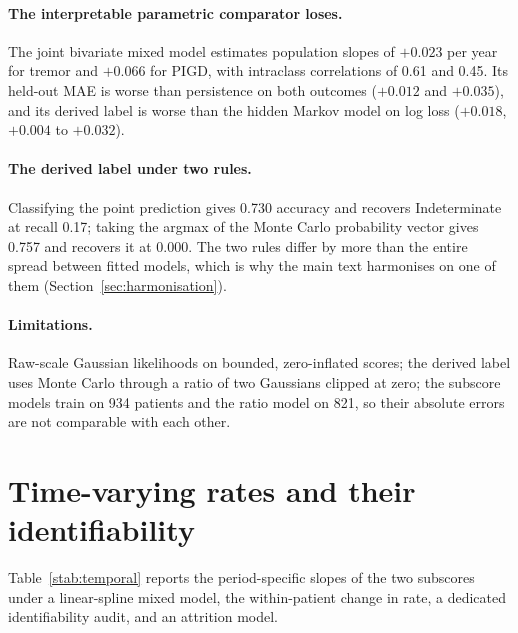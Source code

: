 \paragraph{The interpretable parametric comparator loses.} The joint bivariate
mixed model estimates population slopes of $+0.023$ per year for tremor and
$+0.066$ for PIGD, with intraclass correlations of 0.61 and 0.45. Its held-out
MAE is worse than persistence on both outcomes ($+0.012$ and $+0.035$), and its
derived label is worse than the hidden Markov model on log loss ($+0.018$,
$+0.004$ to $+0.032$).

\paragraph{The derived label under two rules.} Classifying the point prediction
gives 0.730 accuracy and recovers Indeterminate at recall 0.17; taking the argmax
of the Monte Carlo probability vector gives 0.757 and recovers it at 0.000. The
two rules differ by more than the entire spread between fitted models, which is
why the main text harmonises on one of them (Section~\ref{sec:harmonisation}).

\begin{table}[htbp]
\centering
\caption{The full subscore comparison on identical leave-one-patient-out points.}
\label{stab:subscore}
\footnotesize

\end{table}

\paragraph{Limitations.} Raw-scale Gaussian likelihoods on bounded, zero-inflated
scores; the derived label uses Monte Carlo through a ratio of two Gaussians
clipped at zero; the subscore models train on 934 patients and the ratio model on
821, so their absolute errors are not comparable with each other.

\section{Time-varying rates and their identifiability}
\label{sup:temporal}

Table~\ref{stab:temporal} reports the period-specific slopes of the two subscores
under a linear-spline mixed model, the within-patient change in rate, a dedicated
identifiability audit, and an attrition model.

